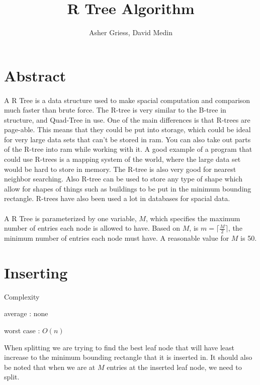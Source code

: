 \documentclass{article}
\author{Asher Griess, David Medin}
\title{R Tree Algorithm}
\begin{document}
\maketitle


\begin{multicols}{2}[]
\section{Abstract}
\paragraph{}
A R Tree is a data structure used to make spacial computation and comparison much faster than brute force.
The R-tree is very similar to the B-tree in structure, and Quad-Tree in use. One of the main differences is that
R-trees are page-able. This means that they could be put into storage, which could be ideal for very large data sets 
that can't be stored in ram.  You can also take out parts of the R-tree into ram while working with it. A good example
of a program that could use R-trees is a mapping system of the world, where the large data set would be hard to store in memory.
The R-tree is also very good for nearest neighbor searching. Also R-tree can be used to store any type of shape which allow for shapes
of things such as buildings to be put in the minimum bounding rectangle. R-trees have also been used a lot in databases for spacial data.
\paragraph{}
A R Tree is parameterized by one variable, $M$, which specifies the maximum number of entries each node is allowed to have. Based on $M$, is $m = \lceil\frac{M}{2}\rceil$, the minimum number of entries each node must have. A reasonable value for $M$ is 50. \cite{guttman_1984_rtrees}

\section{Inserting}
Complexity

average : none

worst case : $O(n)$

When splitting we are trying to find the best leaf node
that will have least increase to the minimum bounding rectangle that it is inserted in.
It should also be noted that when we are at $M$ entries at the inserted leaf node, we
need to split.


\end{multicols}
\end{document}
